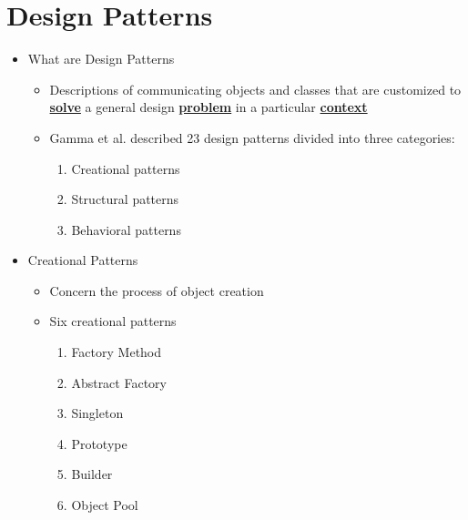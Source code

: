 \section{Design Patterns}
\begin{itemize}
	\item What are Design Patterns
	\begin{itemize}
		\item Descriptions of communicating objects and classes that are customized to \textbf{\underline{solve}} a general design \textbf{\underline{problem}} in a particular \textbf{\underline{context}}
		\item 	Gamma et al. described 23 design patterns divided into three categories:
		\begin{enumerate}
			\item Creational patterns
			\item Structural patterns
			\item Behavioral patterns
		\end{enumerate}
	\end{itemize}

	\item Creational Patterns
	\begin{itemize}
		\item Concern the process of object creation
		\item Six creational patterns\\[-10pt]
		\begin{minipage}[t]{0.25\textwidth}
			\begin{enumerate}
				\item Factory Method
				\item Abstract Factory
				\item Singleton
			\end{enumerate}
		\end{minipage}
		\begin{minipage}[t]{0.4\textwidth}
			\begin{enumerate}
				\setcounter{enumi}{3}
				\item Prototype
				\item Builder
				\item Object Pool
			\end{enumerate}
		\end{minipage}
	\end{itemize}


\end{itemize}
